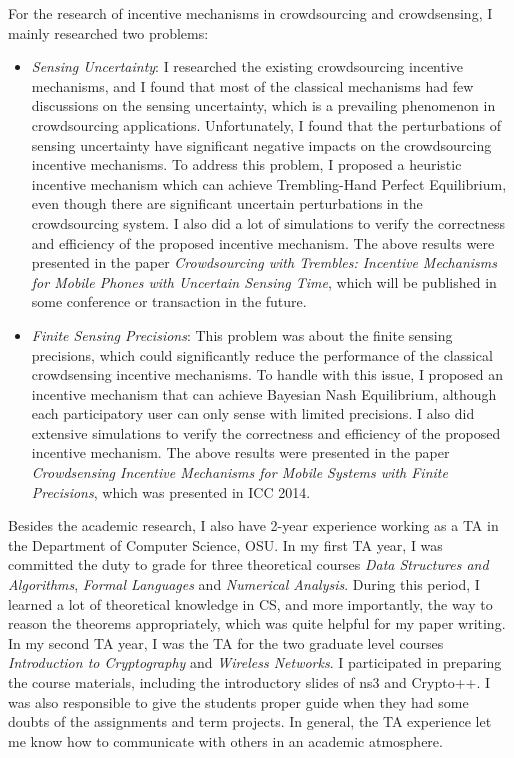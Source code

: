 \documentclass{letter}
\begin{document}
For the research of incentive mechanisms in crowdsourcing and crowdsensing, I mainly researched two problems:
\begin{itemize}
\item \emph{Sensing Uncertainty}: I researched the existing crowdsourcing incentive mechanisms, and I found that most of the classical mechanisms had few discussions on the sensing uncertainty, which is a prevailing phenomenon in crowdsourcing applications. Unfortunately, I found that the perturbations of sensing uncertainty have significant negative impacts on the crowdsourcing incentive mechanisms. To address this problem, I proposed a heuristic incentive mechanism which can achieve Trembling-Hand Perfect Equilibrium, even though there are significant uncertain perturbations in the crowdsourcing system. I also did a lot of simulations to verify the correctness and efficiency of the proposed incentive mechanism. The above results were presented in the paper \emph{Crowdsourcing with Trembles: Incentive Mechanisms for Mobile Phones with Uncertain Sensing Time}, which will be published in some conference or transaction in the future.
\item \emph{Finite Sensing Precisions}: This problem was about the finite sensing precisions, which could significantly reduce the performance of the classical crowdsensing incentive mechanisms. To handle with this issue, I proposed an incentive mechanism that can achieve Bayesian Nash Equilibrium, although each participatory user can only sense with limited precisions. I also did extensive simulations to verify the correctness and efficiency of the proposed incentive mechanism. The above results were presented in the paper \emph{Crowdsensing Incentive Mechanisms for Mobile Systems with Finite Precisions}, which was presented in ICC 2014.
\end{itemize}

Besides the academic research, I also have 2-year experience working as a TA in the Department of Computer Science, OSU. In my first TA year, I was committed the duty to grade for three theoretical courses \emph{Data Structures and Algorithms}, \emph{Formal Languages} and \emph{Numerical Analysis}. During this period, I learned a lot of theoretical knowledge in CS, and more importantly, the way to reason the theorems appropriately, which was quite helpful for my paper writing. In my second TA year, I was the TA for the two graduate level courses \emph{Introduction to Cryptography} and \emph{Wireless Networks}. I participated in preparing the course materials, including the introductory slides of ns3 and Crypto++. I was also responsible to give the students proper guide when they had some doubts of the assignments and term projects. In general, the TA experience let me know how to communicate with others in an academic atmosphere.
\end{document}
